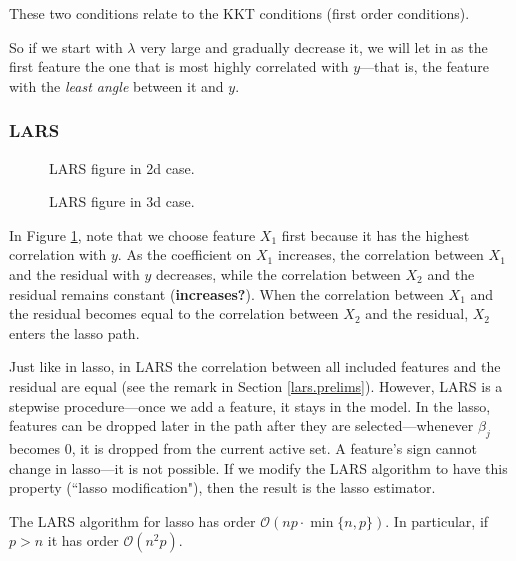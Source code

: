 These two conditions relate to the KKT conditions (first order conditions).

So if we start with \(\lambda\) very large and gradually decrease it, we will let in as the first feature the one that is most highly correlated with \(y\)---that is, the feature with the \textit{least angle} between it and \(y\).


\subsubsection{LARS}

\begin{figure}
\caption{\label{fig:lars_2d} LARS figure in 2d case.}
\end{figure}

\begin{figure}
\caption{\label{fig:lars_3d} LARS figure in 3d case.}
\end{figure}

In Figure \ref{fig:lars_2d}, note that we choose feature \(X_1\) first because it has the highest correlation with \(y\). As the coefficient on \(X_1\) increases, the correlation between \(X_1\) and the residual with \(y\) decreases, while the correlation between \(X_2\) and the residual remains constant (\textbf{increases?}). When the correlation between \(X_1\) and the residual becomes equal to the correlation between \(X_2\) and the residual, \(X_2\) enters the lasso path.

\begin{remark} Just like in lasso, in LARS the correlation between all included features and the residual are equal (see the remark in Section \ref{lars.prelims}). However, LARS is a stepwise procedure---once we add a feature, it stays in the model. In the lasso, features can be dropped later in the path after they are selected---whenever \(\beta_j\) becomes 0, it is dropped from the current active set. A feature's sign cannot change in lasso---it is not possible. If we modify the LARS algorithm to have this property (``lasso modification"), then the result is the lasso estimator.

\end{remark}

The LARS algorithm for lasso has order \(\mathcal{O}(np \cdot \min \{n, p\})\). In particular, if \(p > n\) it has order \(\mathcal{O}(n^2p)\).


